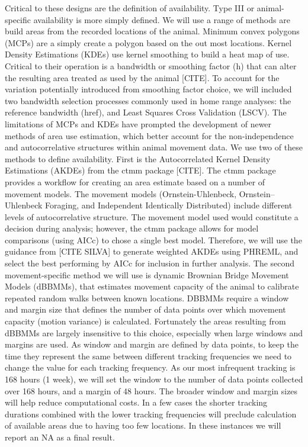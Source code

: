 \documentclass[10pt,a4paper]{article}
\begin{document}
Critical to these designs are the definition of availability.
Type III or animal-specific availability is more simply defined.
We will use a range of methods are build areas from the recorded locations of the animal.
Minimum convex polygons (MCPs) are a simply create a polygon based on the out most locations.
Kernel Density Estimations (KDEs) use kernel smoothing to build a heat map of use.
Critical to their operation is a bandwidth or smoothing factor (h) that can alter the resulting area treated as used by the animal {[}CITE{]}.
To account for the variation potentially introduced from smoothing factor choice, we will included two bandwidth selection processes commonly used in home range analyses: the reference bandwidth (href), and Least Squares Cross Validation (LSCV).
The limitations of MCPs and KDEs have prompted the development of newer methods of area use estimation, which better account for the non-independence and autocorrelative structures within animal movement data.
We use two of these methods to define availability.
First is the Autocorrelated Kernel Density Estimations (AKDEs) from the ctmm package {[}CITE{]}.
The ctmm package provides a workflow for creating an area estimate based on a number of movement models.
The movement models (Ornstein-Uhlenbeck, Ornstein--Uhlenbeck Foraging, and Independent Identically Distributed) include different levels of autocorrelative structure.
The movement model used would constitute a decision during analysis; however, the ctmm package allows for model comparisons (using AICc) to chose a single best model.
Therefore, we will use the guidance from {[}CITE SILVA{]} to generate weighted AKDEs using PHREML, and select the best performing by AICc for inclusion in further analysis.
The second movement-specific method we will use is dynamic Brownian Bridge Movement Models (dBBMMs), that estimates movement capacity of the animal to calibrate repeated random walks between known locations.
DBBMMs require a window and margin size that defines the number of data points over which movement capacity (motion variance) is calculated.
Fortunately the areas resulting from dBBMMs are largely insensitive to this choice, especially when large windows and margins are used.
As window and margin are defined by data points, to keep the time they represent the same between different tracking frequencies we need to change the value for each tracking frequency.
As our most infrequent tracking is 168 hours (1 week), we will set the window to the number of data points collected over 168 hours, and a margin of 48 hours.
The broader window and margin sizes will help reduce computational costs.
In a few cases the shorter tracking durations combined with the lower tracking frequencies will preclude calculation of available areas due to having too few locations.
In these instances we will report an NA as a final result.
\end{document}
